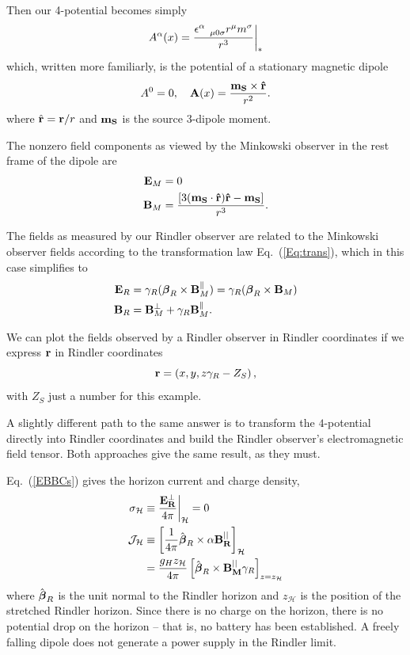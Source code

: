 Then our 4-potential becomes simply
\begin{align}
A^{\alpha}(x) = \frac{ \epsilon^{\alpha }_{ \quad \mu 0 \sigma}r^{\mu} m^{\sigma} }{r^3} \bigg{|}_*
\end{align}
which, written more familiarly, is the potential of a stationary magnetic dipole
\begin{align}
A^0  = 0, \quad  {\bf{A}} (x) = \frac {\bf{m_S} \times \hat{\bf{r}}}{r^2}.
\end{align}
where $\hat{\bf{r}}=\textbf{r}/r$ and ${\bf{m_S}}$ is the source 3-dipole moment.

The nonzero field components as viewed by the
Minkowski observer in the rest frame of the dipole are 
\begin{align}
{\bf E}_M &=0  \nonumber \\
{\bf B}_M &=\frac{\left[3(\bf{m_S} \cdot \hat{\bf{r}})\hat{\bf{r}} - \bf{m_S} \right]}{r^3}.
\label{BDipMinkGen}
\end{align}


The fields as measured by our Rindler
observer are related to the Minkowski observer fields according to
the transformation law Eq.\ (\ref{Eq:trans}), which in this case simplifies to
\begin{align}
{\bf E}_R &= \gamma_R({\boldsymbol \beta}_R \times {\bf B}_M^{\parallel}) = \gamma_R({\boldsymbol \beta}_R \times {\bf B}_M) \nonumber \\
{\bf B}_R &= {\bf B}_M^{\perp} +\gamma_R {\bf B}_M^{\parallel}.
\label{Eq:ERBR1}
\end{align}


We can plot the fields observed by a Rindler observer
in Rindler coordinates if we express 
${\bf r}$ in Rindler coordinates
\begin{equation}
{\bf r} =\left (x,y,z\gamma_R -Z_S \right ),
\label{Eq:rRindler}
\end{equation}
with $Z_S$ just a number for this example.

A slightly different path to the same answer is to 
transform the $4$-potential directly into Rindler coordinates and build
the Rindler observer's electromagnetic field tensor. Both approaches give the
same result, as they must.


Eq.\  (\ref{EBBCs}) gives the horizon current and charge density,
\begin{align}
\sigma_{\mathcal{H}} &\equiv \frac{\bf{E_R^{\perp}}}{4 \pi} \bigg{|}_{\mathcal{H}} =0   \nonumber \\
\mathbf{\mathcal{J}_\mathcal{H}} &\equiv \left[ \frac{1}{4 \pi}    \hat{\bb}_R \times  \alpha \mathbf{B_R^{||}}  \right]_{\mathcal{H}}  \nonumber \\
&= \frac{g_H z_\mathcal{H}}{4 \pi}  \left[    \hat{\bb}_R \times  \mathbf{B_M^{||}} \gamma_R   \right]_{z=z_\mathcal{H}}  %
\label{SHJH_INF}
\end{align}
where $  \hat{{\boldsymbol \beta}}_R$ is the unit normal to the Rindler horizon
and $z_\mathcal{H}$ is the position of the stretched Rindler horizon.
Since there is no charge on the horizon, there is no potential drop on
the horizon -- that is, no battery has been established. A freely
falling dipole does not generate a power supply in the Rindler limit.


